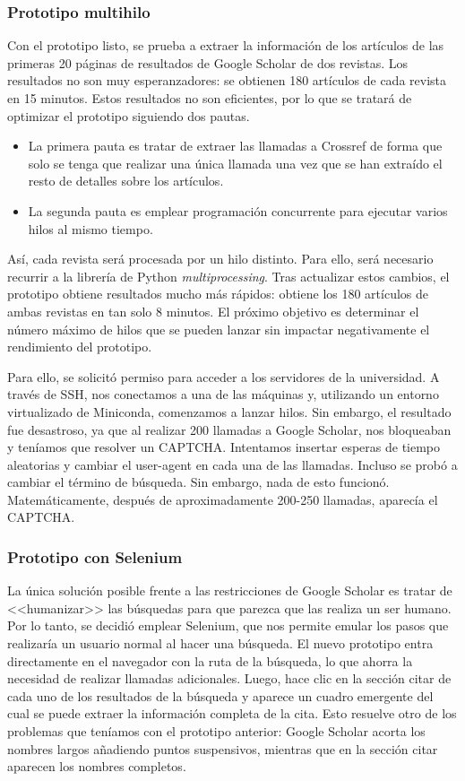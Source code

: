 \subsubsection{Prototipo multihilo}

Con el prototipo listo, se prueba a extraer la información de los artículos de las primeras 20 páginas de resultados de Google Scholar de dos revistas. Los resultados no son muy esperanzadores: se obtienen 180 artículos de cada revista en 15 minutos. Estos resultados no son eficientes, por lo que se tratará de optimizar el prototipo siguiendo dos pautas. 

\begin{itemize}
    \item La primera pauta es tratar de extraer las llamadas a Crossref de forma que solo se tenga que realizar una única llamada una vez que se han extraído el resto de detalles sobre los artículos.
    \item La segunda pauta es emplear programación concurrente para ejecutar varios hilos al mismo tiempo.
\end{itemize}

Así, cada revista será procesada por un hilo distinto. Para ello, será necesario recurrir a la librería de Python \textit{multiprocessing}. Tras actualizar estos cambios, el prototipo obtiene resultados mucho más rápidos: obtiene los 180 artículos de ambas revistas en tan solo 8 minutos. El próximo objetivo es determinar el número máximo de hilos que se pueden lanzar sin impactar negativamente el rendimiento del prototipo.

Para ello, se solicitó permiso para acceder a los servidores de la universidad. A través de SSH, nos conectamos a una de las máquinas y, utilizando un entorno virtualizado de Miniconda, comenzamos a lanzar hilos. Sin embargo, el resultado fue desastroso, ya que al realizar 200 llamadas a Google Scholar, nos bloqueaban y teníamos que resolver un CAPTCHA. Intentamos insertar esperas de tiempo aleatorias y cambiar el user-agent en cada una de las llamadas. Incluso se probó a cambiar el término de búsqueda. Sin embargo, nada de esto funcionó. Matemáticamente, después de aproximadamente 200-250 llamadas, aparecía el CAPTCHA.


\subsubsection{Prototipo con Selenium}
La única solución posible frente a las restricciones de Google Scholar es tratar de <<humanizar>> las búsquedas para que parezca que las realiza un ser humano. Por lo tanto, se decidió emplear Selenium, que nos permite emular los pasos que realizaría un usuario normal al hacer una búsqueda. El nuevo prototipo entra directamente en el navegador con la ruta de la búsqueda, lo que ahorra la necesidad de realizar llamadas adicionales. Luego, hace clic en la sección citar de cada uno de los resultados de la búsqueda y aparece un cuadro emergente del cual se puede extraer la información completa de la cita. Esto resuelve otro de los problemas que teníamos con el prototipo anterior: Google Scholar acorta los nombres largos añadiendo puntos suspensivos, mientras que en la sección citar aparecen los nombres completos. 

